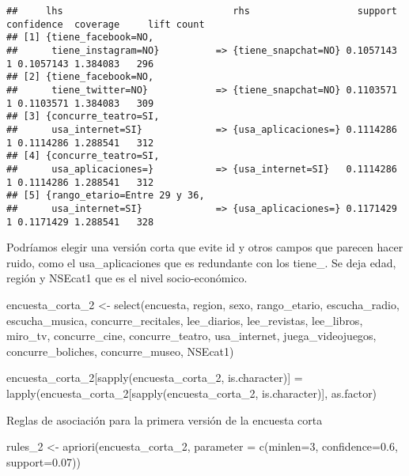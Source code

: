 \documentclass[
]{article}
\newenvironment{Shaded}{\begin{snugshade}}{\end{snugshade}}
\newcommand{\AttributeTok}[1]{\textcolor[rgb]{0.77,0.63,0.00}{#1}}
\newcommand{\DecValTok}[1]{\textcolor[rgb]{0.00,0.00,0.81}{#1}}
\newcommand{\FloatTok}[1]{\textcolor[rgb]{0.00,0.00,0.81}{#1}}
\newcommand{\FunctionTok}[1]{\textcolor[rgb]{0.00,0.00,0.00}{#1}}
\newcommand{\NormalTok}[1]{#1}
\newcommand{\OtherTok}[1]{\textcolor[rgb]{0.56,0.35,0.01}{#1}}
\begin{document}
\begin{verbatim}
##     lhs                              rhs                   support confidence  coverage     lift count
## [1] {tiene_facebook=NO,                                                                               
##      tiene_instagram=NO}          => {tiene_snapchat=NO} 0.1057143          1 0.1057143 1.384083   296
## [2] {tiene_facebook=NO,                                                                               
##      tiene_twitter=NO}            => {tiene_snapchat=NO} 0.1103571          1 0.1103571 1.384083   309
## [3] {concurre_teatro=SI,                                                                              
##      usa_internet=SI}             => {usa_aplicaciones=} 0.1114286          1 0.1114286 1.288541   312
## [4] {concurre_teatro=SI,                                                                              
##      usa_aplicaciones=}           => {usa_internet=SI}   0.1114286          1 0.1114286 1.288541   312
## [5] {rango_etario=Entre 29 y 36,                                                                      
##      usa_internet=SI}             => {usa_aplicaciones=} 0.1171429          1 0.1171429 1.288541   328
\end{verbatim}

Podríamos elegir una versión corta que evite id y otros campos que
parecen hacer ruido, como el usa\_aplicaciones que es redundante con los
tiene\_. Se deja edad, región y NSEcat1 que es el nivel socio-económico.

\begin{Shaded}
\begin{Highlighting}[]
\NormalTok{encuesta\_corta\_2 }\OtherTok{\textless{}{-}} \FunctionTok{select}\NormalTok{(encuesta, region, sexo, rango\_etario, escucha\_radio, escucha\_musica, concurre\_recitales, lee\_diarios, lee\_revistas, lee\_libros, miro\_tv, concurre\_cine, concurre\_teatro, usa\_internet, juega\_videojuegos, concurre\_boliches, concurre\_museo, NSEcat1)}

\NormalTok{encuesta\_corta\_2[}\FunctionTok{sapply}\NormalTok{(encuesta\_corta\_2, is.character)] }\OtherTok{=} \FunctionTok{lapply}\NormalTok{(encuesta\_corta\_2[}\FunctionTok{sapply}\NormalTok{(encuesta\_corta\_2, is.character)], as.factor)}
\end{Highlighting}
\end{Shaded}

Reglas de asociación para la primera versión de la encuesta corta

\begin{Shaded}
\begin{Highlighting}[]
\NormalTok{rules\_2 }\OtherTok{\textless{}{-}} \FunctionTok{apriori}\NormalTok{(encuesta\_corta\_2, }\AttributeTok{parameter =} \FunctionTok{c}\NormalTok{(}\AttributeTok{minlen=}\DecValTok{3}\NormalTok{, }\AttributeTok{confidence=}\FloatTok{0.6}\NormalTok{, }\AttributeTok{support=}\FloatTok{0.07}\NormalTok{))}
\end{Highlighting}
\end{Shaded}
\end{document}
